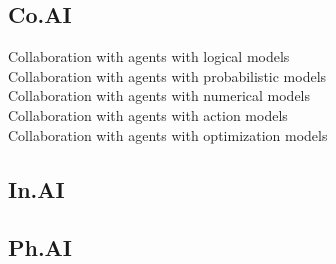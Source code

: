 \subsection{Co.AI}
\begin{description}
\item[Collaboration with agents with logical models]
\item[Collaboration with agents with probabilistic models]
\item[Collaboration with agents with numerical models]
\item[Collaboration with agents with action models]
\item[Collaboration with agents with optimization models]    
\end{description}

\subsection{In.AI}

  \subsection{Ph.AI}
